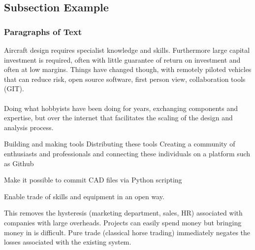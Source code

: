 \documentclass{beamer}
\begin{document}
\subsection{Subsection Example} %

\begin{frame}
\frametitle{Paragraphs of Text}
Aircraft design requires specialist knowledge and skills.  Furthermore large capital investment is required, often with little guarantee of return on investment and often at low margins.  Things have changed though, with remotely piloted vehicles that can reduce risk, open source software, first person view, collaboration tools (GIT). \\~\\

Doing what hobbyists have been doing for years, exchanging components and expertise, but over the internet that facilitates the scaling of the design and analysis process.

Building and making tools
Distributing these tools
Creating a community of enthusiasts and professionals and connecting these individuals on a platform such as Github

Make it possible to commit CAD files via Python scripting

Enable trade of skills and equipment in an open way.

This removes the hysteresis (marketing department, sales, HR) associated with companies with large overheads.  Projects can easily spend money but bringing money in is difficult.
Pure trade (classical horse trading) immediately negates the losses associated with the existing system.

\end{frame}

\end{document}
